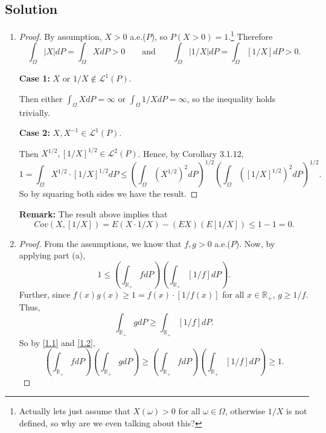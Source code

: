 \documentclass[12pt]{article}
\begin{document}
\subsection*{Solution}
\begin{enumerate}[label=(\alph*)]
\item 
\begin{proof} By assumption, $X > 0$ a.e.($P$), so $P(X > 0) = 1$.\footnote{Actually lets just assume that $X(\omega) > 0$ for all $\omega \in
\Omega$, otherwise $1/X$ is not defined, so why are we even talking about this?} Therefore
\[ \int_{\Omega}|X|dP = \int_{\Omega}XdP > 0 \qquad \text{and} \qquad \int_{\Omega}|1/X|dP = \int_{\Omega}[1/X]dP > 0. \]

{\bf Case 1:} $X$ or $1/X \notin \mathcal{L}^{1}(P)$.

Then either $\int_{\Omega}XdP = \infty$ or $\int_{\Omega}1/XdP = \infty$, so the inequality holds trivially. 

{\bf Case 2:} $X, X^{-1} \in \mathcal{L}^{1}(P)$.

Then $X^{1/2}, [1/X]^{1/2} \in \mathcal{L}^{2}(P)$. Hence, by Corollary 3.1.12,
\[ 1 = \int_{\Omega}X^{1/2}\cdot [1/X]^{1/2}dP \leq \left( \int_{\Omega}(X^{1/2})^{2}dP \right)^{1/2}\left( \int_{\Omega}([1/X]^{1/2})^{2} dP \right)^{1/2}.\]
So by squaring both sides we have the result.
\end{proof}

\vspace{5mm}
{\bf Remark:} The result above implies that 
\[ Cov(X, [1/X]) = E(X\cdot 1/X) - (EX)(E[1/X]) \leq 1 - 1 = 0.\] 

\newpage
\item 
\begin{proof}
From the assumptions, we know that $f,g > 0$ a.e.($P$). Now, by applying part (a),
\begin{equation}
1 \leq \left( \int_{\mathbb{R}_{+}}fdP \right)\left( \int_{\mathbb{R}_{+}}[1/f]dP \right).
\label{1.1}
\end{equation}
Further, since $f(x)g(x) \geq 1 = f(x)\cdot [1/f(x)]$ for all $x \in \mathbb{R}_{+}$, $g \geq 1/f$. Thus,
\begin{equation}
\int_{\mathbb{R}_{+}}gdP \geq \int_{\mathbb{R}_{+}}[1/f]dP.
\label{1.2}
\end{equation}
So by \eqref{1.1} and \eqref{1.2},
\[ \left( \int_{\mathbb{R}_{+}}fdP \right)\left( \int_{\mathbb{R}_{+}}gdP \right) \geq \left( \int_{\mathbb{R}_{+}}fdP \right)\left( 
\int_{\mathbb{R}_{+}}[1/f]dP \right) \geq 1. \]
\end{proof}
\end{enumerate}
\end{document}
